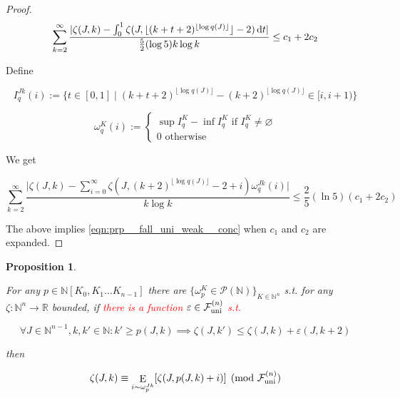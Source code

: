 \documentclass[11pt]{article}
\numberwithin{equation}{section}
\theoremstyle{definition}
\theoremstyle{plain}
\newtheorem{proposition}{Proposition}[section]
\DeclareMathOperator{\E}{E}
\newcommand{\Nats}{\mathbb{N}}
\newcommand{\Reals}{\mathbb{R}}
\newcommand{\NatPoly}{\Nats[K_0, K_1 \ldots K_{n-1}]}
\newcommand{\NatFun}{\Nats^n \rightarrow}
\newcommand{\Abs}[1]{\lvert #1 \rvert}
\newcommand{\Floor}[1]{\lfloor #1 \rfloor}
\newcommand{\Fall}{\mathcal{F}}
\newcommand{\FallU}{{\Fall_{\textnormal{uni}}^{(n)}}}
\begin{document}
\begin{proof}
\[\sum_{k=2}^\infty \frac{\Abs{\zeta(J,k) - \int_0^1 \zeta(J,\Floor{(k+t+2)^{\Floor{\log q(J)}}}-2)\dif t}}{\frac{5}{2} (\log 5) k \log k} \leq c_{1}+2c_{2}\]

Define

\[I_q^{Jk}(i):=\{t \in [0,1] \mid (k+t+2)^{\Floor{\log q(J)}} - (k+2)^{\Floor{\log q(J)}} \in [i,i+1)\}\]

\[\omega_q^K(i):=\begin{cases}\sup I_q^K-\inf I_q^K \text{ if } I_q^K \ne \varnothing\\0 \text{ otherwise}\end{cases}\]

We get

\[\sum_{k=2}^\infty \frac{\Abs{\zeta(J,k) - \sum_{i=0}^\infty \zeta(J,(k+2)^{\Floor{\log q(J)}}-2+i)\omega_q^{Jk}(i) }}{k \log k}  \leq \frac{2}{5}(\ln 5)(c_{1}+2c_{2})\]

The above implies \ref{eqn:prp__fall_uni_weak__conc} when $c_{1}$ and $c_{2}$ are expanded.
%
\end{proof}

\begin{samepage}
\begin{proposition}
\label{prp:fall_uni}

For any ${p \in \NatPoly}$ there are ${\{\omega_p^K \in \mathcal{P}(\Nats)\}_{K \in \Nats^n}}$ s.t. for any\\ $\zeta: \NatFun \Reals$ bounded, if \textcolor{red}{there is a function $\varepsilon\in\FallU$ s.t.}

\begin{equation}
\label{eqn:prp__fall_uni__prem}
\forall J \in \Nats^{n-1}, k,k' \in \Nats: k' \geq p(J,k) \implies \zeta(J,k') \leq \zeta(J,k) + \varepsilon(J,k+2)
\end{equation}

then

\begin{equation}
\label{eqn:prp__fall_uni__conc}
\zeta(J,k) \equiv \E_{i \sim \omega_p^{Jk}}[\zeta(J,p(J,k)+i)] \pmod \FallU
\end{equation}

\end{proposition}
\end{samepage}
\end{document}
